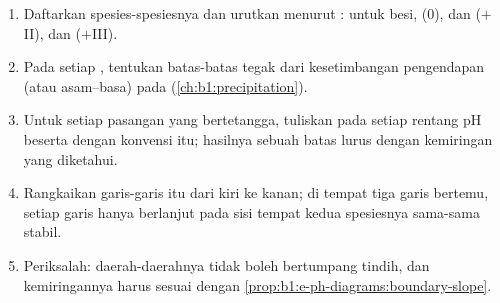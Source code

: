 \begin{method}\label{met:b1:e-ph-diagrams:build}
\begin{enumerate}
  \item Daftarkan spesies-spesiesnya dan urutkan menurut : untuk besi,  (0),  dan 
        ($+$II),  dan  ($+$III).
  \item Pada setiap , tentukan batas-batas tegak dari
        kesetimbangan pengendapan (atau asam--basa) pada 
        (\cref{ch:b1:precipitation}).
  \item Untuk setiap pasangan  yang bertetangga, tuliskan
         pada setiap rentang pH beserta 
        dengan konvensi itu; hasilnya sebuah batas lurus dengan kemiringan
        yang diketahui.
  \item Rangkaikan garis-garis itu dari kiri ke kanan; di tempat tiga
        garis bertemu, setiap garis hanya berlanjut pada sisi tempat kedua
        spesiesnya sama-sama stabil.
  \item Periksalah: daerah-daerahnya tidak boleh bertumpang tindih, dan
        kemiringannya harus sesuai dengan
        \cref{prop:b1:e-ph-diagrams:boundary-slope}.
\end{enumerate}
\end{method}

